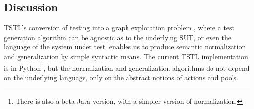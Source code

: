 \subsection{Discussion}

TSTL's conversion of testing into a
graph exploration problem \cite{NFM15}, where a test generation
algorithm can be agnostic as to the underlying SUT, or even the
language of the system under test, enables us to produce semantic
normalization and generalization by simple syntactic means.  The current TSTL implementation is
in Python\footnote{There is also a beta Java version, with a
  simpler version of normalization.}, but the
normalization and generalization algorithms do not depend on the
underlying language, only on the abstract notions of actions and
pools.
